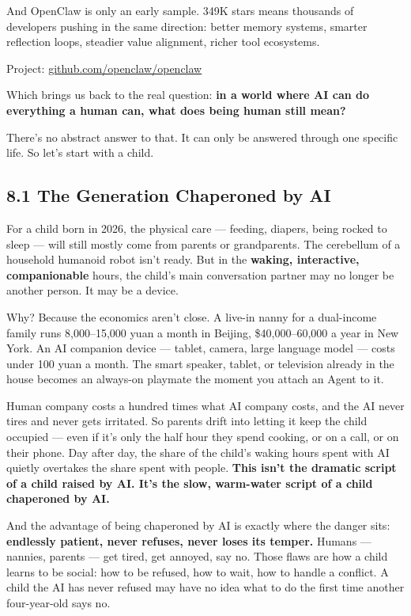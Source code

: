 \documentclass[11pt,a4paper]{article}
\begin{document}
And OpenClaw is only an early sample. 349K stars means thousands of developers pushing in the same direction: better memory systems, smarter reflection loops, steadier value alignment, richer tool ecosystems.

Project: \href{https://github.com/openclaw/openclaw}{github.com/openclaw/openclaw}

Which brings us back to the real question: \textbf{in a world where AI can do everything a human can, what does being human still mean?}

There's no abstract answer to that. It can only be answered through one specific life. So let's start with a child.

\subsection{8.1 The Generation Chaperoned by AI}

For a child born in 2026, the physical care --- feeding, diapers, being rocked to sleep --- will still mostly come from parents or grandparents. The cerebellum of a household humanoid robot isn't ready. But in the \textbf{waking, interactive, companionable} hours, the child's main conversation partner may no longer be another person. It may be a device.

Why? Because the economics aren't close. A live-in nanny for a dual-income family runs 8,000--15,000 yuan a month in Beijing, \$40,000--60,000 a year in New York. An AI companion device --- tablet, camera, large language model --- costs under 100 yuan a month. The smart speaker, tablet, or television already in the house becomes an always-on playmate the moment you attach an Agent to it.

Human company costs a hundred times what AI company costs, and the AI never tires and never gets irritated. So parents drift into letting it keep the child occupied --- even if it's only the half hour they spend cooking, or on a call, or on their phone. Day after day, the share of the child's waking hours spent with AI quietly overtakes the share spent with people. \textbf{This isn't the dramatic script of a child raised by AI. It's the slow, warm-water script of a child chaperoned by AI.}

And the advantage of being chaperoned by AI is exactly where the danger sits: \textbf{endlessly patient, never refuses, never loses its temper.} Humans --- nannies, parents --- get tired, get annoyed, say no. Those flaws are how a child learns to be social: how to be refused, how to wait, how to handle a conflict. A child the AI has never refused may have no idea what to do the first time another four-year-old says no.
\end{document}
